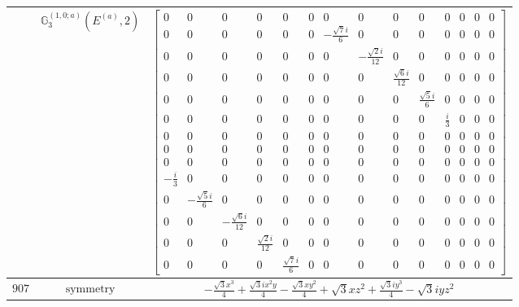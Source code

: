 \documentclass[fleqn,8pt,landscape]{jsarticle}
\begin{document}
\begin{longtable}{ccc}
$  $ & $ \mathbb{G}_{3}^{(1,0;a)}(E^{(a)},2) $ & $ \begin{bmatrix} 0 & 0 & 0 & 0 & 0 & 0 & 0 & 0 & 0 & 0 & 0 & 0 & 0 & 0 \\ 0 & 0 & 0 & 0 & 0 & 0 & - \frac{\sqrt{7} i}{6} & 0 & 0 & 0 & 0 & 0 & 0 & 0 \\ 0 & 0 & 0 & 0 & 0 & 0 & 0 & - \frac{\sqrt{2} i}{12} & 0 & 0 & 0 & 0 & 0 & 0 \\ 0 & 0 & 0 & 0 & 0 & 0 & 0 & 0 & \frac{\sqrt{6} i}{12} & 0 & 0 & 0 & 0 & 0 \\ 0 & 0 & 0 & 0 & 0 & 0 & 0 & 0 & 0 & \frac{\sqrt{5} i}{6} & 0 & 0 & 0 & 0 \\ 0 & 0 & 0 & 0 & 0 & 0 & 0 & 0 & 0 & 0 & \frac{i}{3} & 0 & 0 & 0 \\ 0 & 0 & 0 & 0 & 0 & 0 & 0 & 0 & 0 & 0 & 0 & 0 & 0 & 0 \\ 0 & 0 & 0 & 0 & 0 & 0 & 0 & 0 & 0 & 0 & 0 & 0 & 0 & 0 \\ 0 & 0 & 0 & 0 & 0 & 0 & 0 & 0 & 0 & 0 & 0 & 0 & 0 & 0 \\ - \frac{i}{3} & 0 & 0 & 0 & 0 & 0 & 0 & 0 & 0 & 0 & 0 & 0 & 0 & 0 \\ 0 & - \frac{\sqrt{5} i}{6} & 0 & 0 & 0 & 0 & 0 & 0 & 0 & 0 & 0 & 0 & 0 & 0 \\ 0 & 0 & - \frac{\sqrt{6} i}{12} & 0 & 0 & 0 & 0 & 0 & 0 & 0 & 0 & 0 & 0 & 0 \\ 0 & 0 & 0 & \frac{\sqrt{2} i}{12} & 0 & 0 & 0 & 0 & 0 & 0 & 0 & 0 & 0 & 0 \\ 0 & 0 & 0 & 0 & \frac{\sqrt{7} i}{6} & 0 & 0 & 0 & 0 & 0 & 0 & 0 & 0 & 0 \end{bmatrix} $ \\ \hline
$ 907 $ & $ \text{symmetry} $ & $ - \frac{\sqrt{3} x^{3}}{4} + \frac{\sqrt{3} i x^{2} y}{4} - \frac{\sqrt{3} x y^{2}}{4} + \sqrt{3} x z^{2} + \frac{\sqrt{3} i y^{3}}{4} - \sqrt{3} i y z^{2} $ \\

\end{longtable}
\end{document}
